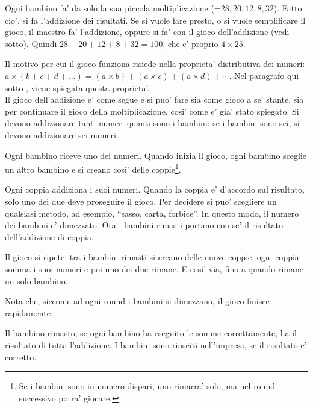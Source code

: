 \documentclass[a4paper]{article}
\begin{document}
Ogni bambino fa' da solo la sua piccola moltiplicazione (=$28, 20, 12, 8, 32$). Fatto cio', si fa l'addizione dei risultati. Se si vuole fare presto, o si vuole semplificare il gioco, il maestro fa' l'addizione, oppure si fa' con il gioco dell'addizione (vedi sotto). Quindi $28+20+12+8+32 = 100$, che e' proprio $4\times 25 $.

Il motivo per cui il gioco funziona risiede nella proprieta' distributiva dei numeri: $a \times (b+c+d+\ldots) = (a\times b)+(a\times c)+(a\times d)+\cdots$. Nel paragrafo qui sotto , viene spiegata questa proprieta'.\\

Il gioco dell'addizione e' come segue e si puo' fare sia come gioco a se' stante, sia per continuare il gioco della moltiplicazione, cosi' come e' gia' stato spiegato.  Si devono addizionare tanti numeri quanti sono i bambini: se i bambini sono sei, si devono addizionare sei numeri.

Ogni bambino riceve uno dei numeri. Quando inizia il gioco, ogni bambino sceglie un altro bambino e si creano cosi' delle coppie\footnote{Se i bambini sono in numero dispari, uno rimarra' solo, ma nel round successivo potra' giocare.}.

Ogni coppia addiziona i suoi numeri. Quando la coppia e' d'accordo sul risultato, solo uno dei due deve proseguire il gioco. Per decidere si puo' scegliere un qualsiasi metodo, ad esempio, ``sasso, carta, forbice''. In questo modo, il numero dei bambini e' dimezzato. Ora i bambini rimasti portano con se' il risultato dell'addizione di coppia.

Il gioco si ripete: tra i bambini rimasti si creano delle nuove coppie, ogni coppia somma i suoi numeri e poi uno dei due rimane.
E cosi' via, fino a quando rimane un solo bambino.

Nota che, siccome ad ogni round i bambini si dimezzano, il gioco finisce rapidamente.

Il bambino rimasto, se ogni bambino ha eseguito le somme correttamente, ha il risultato di tutta l'addizione. I bambini sono riusciti nell'impresa, se il risultato e' corretto.
\end{document}
